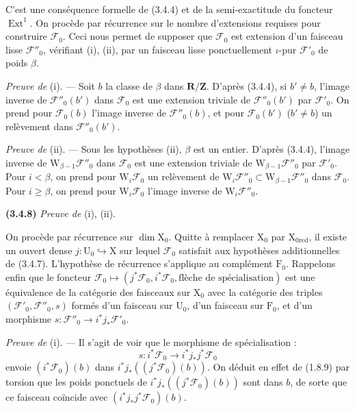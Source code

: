 \documentclass[11pt,leqno]{article}
\begin{document}
C’est une conséquence formelle de (3.4.4) et de la semi-exactitude du foncteur \(\operatorname{Ext}^1\). On procède par récurrence sur le nombre d’extensions requises pour construire \(\mathscr F_0\). Ceci nous permet de supposer que \(\mathscr F_0\) est extension d’un faisceau lisse \(\mathscr F''_0\), vérifiant (i), (ii), par un faisceau lisse ponctuellement \(\iota\)-pur \(\mathscr F'_0\) de poids \(\beta\).

\textit{Preuve de} (i). — Soit \(b\) la classe de \(\beta\) dans \(\mathbf R/\mathbf Z\). D’après (3.4.4), si \(b'\ne b\), l’image inverse de \(\mathscr F''_0(b')\) dans \(\mathscr F_0\) est une extension triviale de \(\mathscr F''_0(b')\) par \(\mathscr F'_0\). On prend pour \(\mathscr F_0(b)\) l’image inverse de \(\mathscr F''_0(b)\), et pour \(\mathscr F_0(b')\) (\(b'\ne b\)) un relèvement dans \(\mathscr F''_0(b')\).

\textit{Preuve de} (ii). — Sous les hypothèses (ii), \(\beta\) est un entier. D’après (3.4.4), l’image inverse de \(\mathrm W_{\beta-1}\mathscr F''_0\) dans \(\mathscr F_0\) est une extension triviale de \(\mathrm W_{\beta-1}\mathscr F''_0\) par \(\mathscr F'_0\). Pour \(i<\beta\), on prend pour \(\mathrm W_i\mathscr F_0\) un relèvement de \(\mathrm W_i\mathscr F''_0\subset\mathrm W_{\beta-1}\mathscr F''_0\) dans \(\mathscr F_0\). Pour \(i\geq\beta\), on prend pour \(\mathrm W_i\mathscr F_0\) l’image inverse de \(\mathrm W_i\mathscr F''_0\).

\textbf{(3.4.8)} \textit{Preuve de} (i), (ii).

On procède par récurrence sur \(\dim\mathrm X_0\). Quitte à remplacer \(\mathrm X_0\) par \(\mathrm X_{0\mathrm{red}}\), il existe un ouvert dense \(j:\mathrm U_0\hookrightarrow\mathrm X\) sur lequel \(\mathscr F_0\) satisfait aux hypothèses additionnelles de (3.4.7). L’hypothèse de récurrence s’applique au complément \(\mathrm F_0\). Rappelons enfin que le foncteur \(\mathscr F_0\mapsto(j^*\mathscr F_0,i^*\mathscr F_0,\text{flèche de spécialisation})\) est une équivalence de la catégorie des faisceaux sur \(\mathrm X_0\) avec la catégorie des triples \((\mathscr F'_0,\mathscr F''_0,s)\) formés d’un faisceau sur \(\mathrm U_0\), d’un faisceau sur \(\mathrm F_0\), et d’un morphisme \(s:\mathscr F''_0\to i^*j_*\mathscr F'_0\).

\textit{Preuve de} (i). — Il s’agit de voir que le morphisme de spécialisation :
\[
s:i^*\mathscr F_0\to i^*j_*j^*\mathscr F_0
\]
envoie \((i^*\mathscr F_0)(b)\) dans \(i^*j_*((j^*\mathscr F_0)(b))\). On déduit en effet de (1.8.9) par torsion que les poids ponctuels de \(i^*j_*((j^*\mathscr F_0)(b))\) sont dans \(b\), de sorte que ce faisceau coïncide avec \((i^*j_*j^*\mathscr F_0)(b)\).
\end{document}

